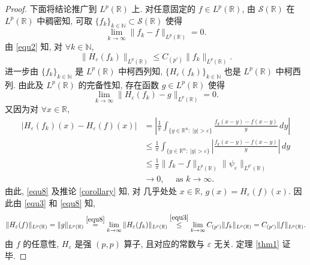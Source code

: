 \documentclass[a4paper,11pt]{article}
\theoremstyle{definition}
\begin{document}
\begin{proof}
    下面将结论推广到 $ L^p(\mathbb{R}) $ 上.
    对任意固定的 $ f \in L^p(\mathbb{R}) $, 
    由 $ \mathcal{S}(\mathbb{R}) $ 在 $ L^p(\mathbb{R}) $ 中稠密知, 
    可取 $ \{f_k\}_{k \in \mathbb{N}} \subset \mathcal{S}(\mathbb{R}) $ 使得
    $$
        \lim_{k \to \infty} \| f_k - f \|_{L^p(\mathbb{R})} = 0.
    $$
    由 \eqref{equ2} 知, 对 $ \forall k \in \mathbb{N} $,
    \begin{equation} \label{equ3}
        \| H_\varepsilon (f_k) \|_{L^p(\mathbb{R})} \leq C_{(p')} \| f_k \|_{L^p(\mathbb{R})}.
    \end{equation}
    进一步由 $ \{f_k\}_{k \in \mathbb{N}} $ 是 $ L^p(\mathbb{R}) $ 中柯西列知, 
    $ \{H_\varepsilon (f_k)\}_{k \in \mathbb{N}} $ 也是 $ L^p(\mathbb{R}) $ 中柯西列.
    由此及 $ L^p(\mathbb{R}) $ 的完备性知, 存在函数 $ g \in L^p(\mathbb{R}) $ 使得
    \begin{equation} \label{equ8}
        \lim_{k \to \infty} \| H_\varepsilon (f_k) - g \|_{L^p(\mathbb{R})} = 0.
    \end{equation}
    又因为对 $ \forall x \in \mathbb{R} $,
    \begin{align*}
        \left|H_\varepsilon (f_k) (x) - H_\varepsilon (f) (x)\right|
            &= \left| \frac{1}{\pi} \int_{\{y \in \mathbb{R}^n :\ |y| > \varepsilon\}} \frac{f_k(x - y) - f(x - y)}{y} \, dy \right| \\
            &\leq \frac{1}{\pi} \int_{\{y \in \mathbb{R}^n :\ |y| > \varepsilon\}} \left| \frac{f_k(x - y) - f(x - y)}{y} \right| \, dy \\
            &\leq \frac{1}{\pi} \| f_k - f \|_{L^p(\mathbb{R})} 
                \| \psi_\varepsilon \|_{L^{p'}(\mathbb{R})} \\
            &\to  0,  \quad \text{ as } k \to \infty.
    \end{align*}
    由此, \eqref{equ8} 及推论 \ref{corollary} 知, 对 几乎处处 $ x \in \mathbb{R} $, $ g(x) = H_\varepsilon (f) (x) $.
    因此由 \eqref{equ3} 和 \eqref{equ8} 知, 
    $$
        \| H_\varepsilon (f) \|_{L^p(\mathbb{R})} 
            = \| g \|_{L^p(\mathbb{R})} 
            \overset{\eqref{equ8}}{=} \lim_{k \to \infty} \| H_\varepsilon (f_k) \|_{L^p(\mathbb{R})} 
            \overset{\eqref{equ3}}{\leq} \lim_{k \to \infty} C_{(p')} \| f_k \|_{L^p(\mathbb{R})} 
            = C_{(p')} \| f \|_{L^p(\mathbb{R})}.
    $$
    由 $ f $ 的任意性, $ H_\varepsilon $ 是强 $ (p, p) $ 算子, 
    且对应的常数与 $ \varepsilon $ 无关. 定理 \ref{thm1} 证毕.
\end{proof}
\end{document}
